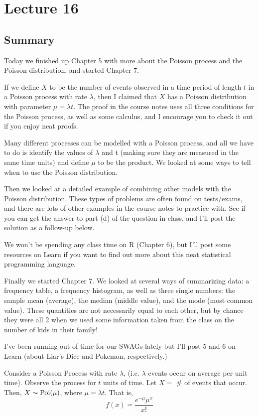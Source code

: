 \section{Lecture 16}
\subsection{Summary}
Today we finished up Chapter 5 with more about the Poisson process and the Poisson distribution, and started Chapter 7.

If we define $X$ to be the number of events observed in a time period of length $t$ in a Poisson process with rate $\lambda$, then I claimed that $X$ has a Poisson distribution with parameter $\mu = \lambda t$. The proof in the course notes uses all three conditions for the Poisson process, as well as some calculus, and I encourage you to check it out if you enjoy neat proofs.

Many different processes can be modelled with a Poisson process, and all we have to do is identify the values of $\lambda$ and t (making sure they are measured in the same time units) and define $\mu$ to be the product. We looked at some ways to tell when to use the Poisson distribution.

Then we looked at a detailed example of combining other models with the Poisson distribution. These types of problems are often found on tests/exams, and there are lots of other examples in the course notes to practice with. See if you can get the answer to part (d) of the question in class, and I'll post the solution as a follow-up below.

We won't be spending any class time on R (Chapter 6), but I'll post some resources on Learn if you want to find out more about this neat statistical programming language.

Finally we started Chapter 7. We looked at several ways of summarizing data: a frequency table, a frequency histogram, as well as three single numbers: the sample mean (average), the median (middle value), and the mode (most common value). These quantities are not necessarily equal to each other, but by chance they were all 2 when we used some information taken from the class on the number of kids in their family!

I've been running out of time for our SWAGs lately but I'll post 5 and 6 on Learn (about Liar's Dice and Pokemon, respectively.)

Consider a Poisson Process with rate $ \lambda $, (i.e. $ \lambda $ events
occur on average per unit time). Observe the process for $ t $ units of time.
Let $ X= $ \# of events that occur. Then, $ X \thicksim \operatorname{Poi}(\mu) $, where
$ \mu=\lambda t $. That is,
\[ f(x)=\frac{e^{-\mu}\mu^x}{x!} \]

